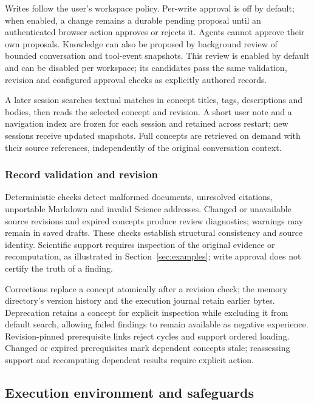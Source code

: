\documentclass[preprint,12pt,a4paper]{elsarticle}
\begin{document}
Writes follow the user's workspace policy. Per-write approval is off by default; when enabled,
a change remains a durable pending proposal until an authenticated browser action approves or
rejects it. Agents cannot approve their own proposals. Knowledge can also be proposed by
background review of bounded conversation and tool-event snapshots. This review is enabled
by default and can be disabled per workspace; its candidates pass the same validation,
revision and configured approval checks as explicitly authored records.

A later session searches textual matches in concept titles, tags, descriptions and bodies,
then reads the selected concept and revision. A short user note and a navigation
index are frozen for each session and retained across restart; new sessions receive updated
snapshots. Full concepts are retrieved on demand with their source references, independently
of the original conversation context.

\subsubsection{Record validation and revision}
\label{sec:knowledge-quality}

Deterministic checks detect malformed documents, unresolved citations, unportable Markdown and
invalid Science addresses. Changed or unavailable source revisions and expired concepts produce
review diagnostics; warnings may remain in saved drafts. These checks establish structural
consistency and source identity. Scientific support requires inspection of the original evidence
or recomputation, as illustrated in Section~\ref{sec:examples}; write approval does not certify
the truth of a finding.

Corrections replace a concept atomically after a revision check; the memory directory's version
history and the execution journal retain earlier bytes. Deprecation retains a
concept for explicit inspection while excluding it from default search, allowing failed findings
to remain available as negative experience. Revision-pinned prerequisite links reject cycles
and support ordered loading. Changed or expired prerequisites mark dependent concepts stale;
reassessing support and recomputing dependent results require explicit action.

\subsection{Execution environment and safeguards}
\label{sec:safeguards}
\end{document}
